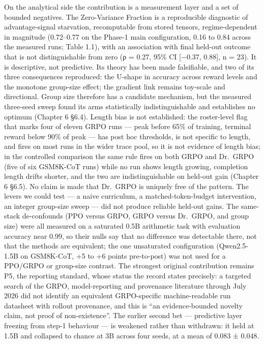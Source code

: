 \documentclass[12pt,a4paper]{report}
\begin{document}
On the analytical side the contribution is a measurement layer and a set
of bounded negatives. The Zero-Variance Fraction is a reproducible
diagnostic of advantage-signal starvation, recomputable from stored
tensors, regime-dependent in magnitude (0.72--0.77 on the Phase-1 main
configuration, 0.16 to 0.84 across the measured runs; Table 1.1), with
an association with final held-out outcome that is not distinguishable
from zero (ρ = 0.27, 95\% CI {[}−0.37, 0.88{]}, n = 23). It is
descriptive, not predictive. Its theory has been made falsifiable, and
two of its three consequences reproduced: the U-shape in accuracy across
reward levels and the monotone group-size effect; the gradient link
remains toy-scale and directional. Group size therefore has a candidate
mechanism, but the measured three-seed sweep found its arms
statistically indistinguishable and establishes no optimum (Chapter 6
§6.4). Length bias is not established: the roster-level flag that marks
four of eleven GRPO runs --- peak before 65\% of training, terminal
reward below 90\% of peak --- has post hoc thresholds, is not specific
to length, and fires on most runs in the wider trace pool, so it is not
evidence of length bias; in the controlled comparison the same rule
fires on both GRPO and Dr.~GRPO (five of six GSM8K-CoT runs) while no
run shows length growing, completion length drifts shorter, and the two
are indistinguishable on held-out gain (Chapter 6 §6.5). No claim is
made that Dr.~GRPO is uniquely free of the pattern. The levers we could
test --- a naive curriculum, a matched-token-budget intervention, an
integer group-size sweep --- did not produce reliable held-out gains.
The same-stack de-confounds (PPO versus GRPO, GRPO versus Dr.~GRPO, and
group size) were all measured on a saturated 0.5B arithmetic task with
evaluation accuracy near 0.99, so their nulls say that no difference was
detectable there, not that the methods are equivalent; the one
unsaturated configuration (Qwen2.5-1.5B on GSM8K-CoT, +5 to +6 points
pre-to-post) was not used for a PPO/GRPO or group-size contrast. The
strongest original contribution remains P5, the reporting standard,
whose status the record states precisely: a targeted search of the GRPO,
model-reporting and provenance literature through July 2026 did not
identify an equivalent GRPO-specific machine-readable run datasheet with
rollout provenance, and this is ``an evidence-bounded novelty claim, not
proof of non-existence''. The earlier second bet --- predictive layer
freezing from step-1 behaviour --- is weakened rather than withdrawn: it
held at 1.5B and collapsed to chance at 3B across four seeds, at a mean
of 0.083 ± 0.048.
\end{document}
